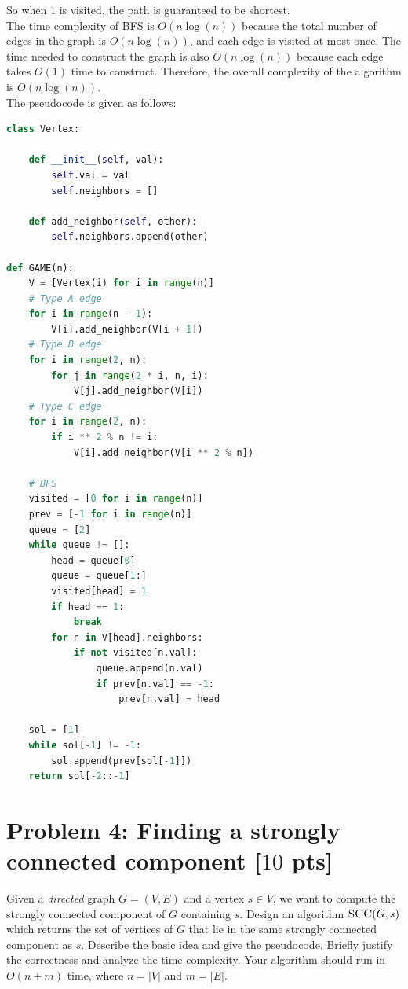 \documentclass[11pt,twoside]{article}
\newcommand{\problem}[1]{\section*{Problem #1}}
\newenvironment{solution}{{\par\noindent\it Solution.}}{}
\begin{document}
\begin{solution}
So when 1 is visited, the path is guaranteed to be shortest. 
\vspace{10pt}\\
The time complexity of BFS is $O(n\log(n))$ because the total number of edges in the graph is $O(n\log(n))$,
and each edge is visited at most once. The time needed to construct the graph is also $O(n\log(n))$ because each edge takes $O(1)$ time to construct.
Therefore, the overall complexity of the algorithm is $O(n\log(n))$.
\vspace{10pt}\\
The pseudocode is given as follows:
\begin{lstlisting}[language=Python]
class Vertex:

    def __init__(self, val):
        self.val = val
        self.neighbors = []

    def add_neighbor(self, other):
        self.neighbors.append(other)

def GAME(n):
    V = [Vertex(i) for i in range(n)]
    # Type A edge
    for i in range(n - 1):
        V[i].add_neighbor(V[i + 1])
    # Type B edge
    for i in range(2, n):
        for j in range(2 * i, n, i):
            V[j].add_neighbor(V[i])
    # Type C edge
    for i in range(2, n):
        if i ** 2 % n != i:
            V[i].add_neighbor(V[i ** 2 % n])

    # BFS
    visited = [0 for i in range(n)]
    prev = [-1 for i in range(n)]
    queue = [2]
    while queue != []:
        head = queue[0]
        queue = queue[1:]
        visited[head] = 1
        if head == 1:
            break
        for n in V[head].neighbors:
            if not visited[n.val]:
                queue.append(n.val)
                if prev[n.val] == -1:
                    prev[n.val] = head 

    sol = [1]
    while sol[-1] != -1:
        sol.append(prev[sol[-1]])
    return sol[-2::-1]
\end{lstlisting}
\end{solution}

\problem{4: Finding a strongly connected component [$10$ pts]}
Given a \textit{directed} graph $G = (V,E)$ and a vertex $s \in V$, we want to compute the strongly connected component of $G$ containing $s$.
Design an algorithm $\textsc{SCC}(G,s)$ which returns the set of vertices of $G$ that lie in the same strongly connected component as $s$.
Describe the basic idea and give the pseudocode.
Briefly justify the correctness and analyze the time complexity.
Your algorithm should run in $O(n+m)$ time, where $n = |V|$ and $m = |E|$.
\end{document}
